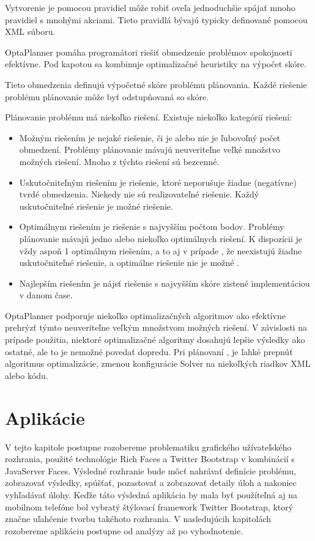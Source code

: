  Vytvorenie je pomocou pravidiel  môže robiť  oveľa jednoduchšie spájať mnoho pravidiel s mnohými akciami. Tieto pravidlá bývajú typicky definované pomocou XML súboru.

OptaPlanner pomáha  programátori riešiť obmedzenie problémov spokojnosti efektívne. Pod kapotou sa kombinuje optimalizačné heuristiky na výpočet skóre.





Tieto obmedzenia definujú výpočetné skóre problému plánovania. Každé riešenie problému plánovanie môže byť odstupňovaná so skóre. 

Plánovanie problému má niekoľko riešení. Existuje niekoľko kategórií riešení:
\begin{itemize}
\item Možným riešením je nejaké riešenie, či je alebo nie je ľubovoľný počet obmedzení. Problémy plánovanie mávajú neuveriteľne veľké množstvo možných riešení. Mnoho z týchto riešení sú bezcenné.
\item Uskutočniteľným riešením je riešenie, ktoré neporušuje žiadne (negatívne) tvrdé obmedzenia. Niekedy nie sú realizovateľné riešenie. Každý uskutočniteľné riešenie je možné riešenie.

\item Optimálnym riešením je riešenie s najvyšším počtom bodov. Problémy plánovanie mávajú jedno alebo niekoľko optimálnych riešení. K dispozícii je vždy aspoň 1 optimálnym riešením, a to aj v prípade , že neexistujú žiadne uskutočniteľné riešenie, a optimálne riešenie nie je možné .
\item Najlepším riešením je nájsť riešenie s najvyšším skóre zistené implementáciou v danom čase.

\end{itemize}

OptaPlanner podporuje niekoľko optimalizačných algoritmov ako efektívne prehrýzť týmto neuveriteľne veľkým množstvom možných riešení. V závislosti na prípade použitia, niektoré optimalizačné algoritmy dosahujú lepšie výsledky ako ostatné, ale to je nemožné povedať dopredu. Pri plánovaní , je ľahké prepnúť algoritmus optimalizácie, zmenou konfigurácie Solver na niekoľkých riadkov XML alebo kódu.


\newpage








\chapter{Aplikácie}
V tejto kapitole postupne rozobereme problematiku grafického užívateľského rozhrania, použité technológie Rich Faces a Twitter Bootstrap v kombinácií s JavaServer Faces. Výsledné rozhranie bude môcť nahrávať definície problému, zobrazovať výsledky, spúšťať, pozastovať a zobrazovať detaily úloh a nakoniec vyhľadávať úlohy. Keďže táto výsledná aplikácia by mala byť použíteľná aj na mobilnom telefóne bol vybratý štýlovací framework Twitter Bootstrap, ktorý značne uľahčenie tvorbu takéhoto rozhrania. V nasledujúcih kapitolách rozobereme aplikáciu postupne od analýzy až po vyhodnotenie.

